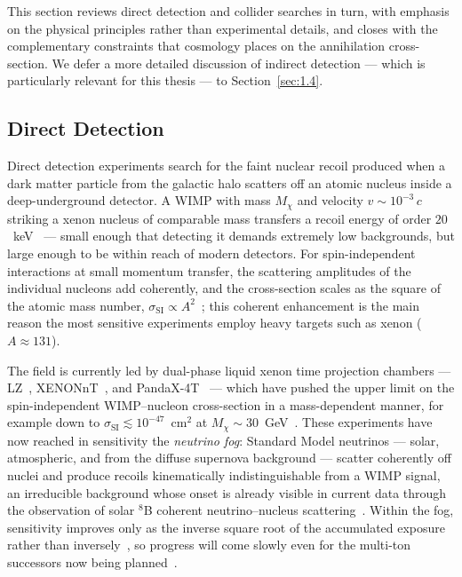 This section reviews direct detection and collider searches in turn, with emphasis on the physical principles rather than experimental details, and closes with the complementary constraints that cosmology places on the annihilation cross-section.
We defer a more detailed discussion of indirect detection --- which is particularly relevant for this thesis --- to Section~\ref{sec:1.4}.

\subsection{Direct Detection}
\label{sec:1.3.1}

Direct detection experiments search for the faint nuclear recoil produced when a dark matter particle from the galactic halo scatters off an atomic nucleus inside a deep-underground detector.
A WIMP with mass $M_\chi$ and velocity $v \sim 10^{-3}\,c$ striking a xenon nucleus of comparable mass transfers a recoil energy of order $20$~keV~\cite{Dodelson:2020bqr} --- small enough that detecting it demands extremely low backgrounds, but large enough to be within reach of modern detectors.
For spin-independent interactions at small momentum transfer, the scattering amplitudes of the individual nucleons add coherently, and the cross-section scales as the square of the atomic mass number, $\sigma_\text{SI} \propto A^2$~\cite{Hooper:2024}; this coherent enhancement is the main reason the most sensitive experiments employ heavy targets such as xenon ($A \approx 131$).

The field is currently led by dual-phase liquid xenon time projection chambers --- LZ~\cite{LZ:2022lsv}, XENONnT~\cite{XENON:2023cxc}, and PandaX-4T~\cite{PandaX-4T:2021bab} --- which have pushed the upper limit on the spin-independent WIMP--nucleon cross-section in a mass-dependent manner, for example down to $\sigma_\text{SI} \lesssim 10^{-47}$~cm$^2$ at $M_\chi \sim 30$~GeV~\cite{LZ:2024zvo}.
These experiments have now reached in sensitivity the \emph{neutrino fog}: Standard Model neutrinos --- solar, atmospheric, and from the diffuse supernova background --- scatter coherently off nuclei and produce recoils kinematically indistinguishable from a WIMP signal, an irreducible background whose onset is already visible in current data through the observation of solar $^8$B coherent neutrino--nucleus scattering~\cite{XENON:2020gfr,PandaX:2024muv,XENON:2024hup,LZ:2024zvo}.
Within the fog, sensitivity improves only as the inverse square root of the accumulated exposure rather than inversely~\cite{OHare:2021utq}, so progress will come slowly even for the multi-ton successors now being planned~\cite{DARWIN:2016hyl}.

